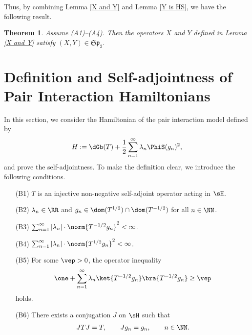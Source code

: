 \documentclass[12pt,draft]{article}
\theoremstyle{plain}
\newtheorem{thm}[theorem]{\bf Theorem}
\numberwithin{equation}{section}
\theoremstyle{remark}
\begin{document}
Thus, by combining Lemma \ref{X and Y} and Lemma \ref{Y is HS}, we have the following result.
\begin{thm}\label{SP2}
  Assume (A1)--(A4). Then the operators $X$ and $Y$ defined in Lemma \ref{X and Y} satisfy
$(X,Y)\in\mathfrak{Sp}_2$.
\end{thm}






\section{Definition and Self-adjointness of Pair Interaction Hamiltonians}\label{DefModel}
In this section, we consider the Hamiltonian of the pair interaction model defined by
\begin{align}
  H := \dGb(T) + \frac{1}{2} \sum_{n=1}^\infty \lambda_n \PhiS(g_n)^2, \label{hamil}
\end{align}
and prove the self-adjointness.
To make the definition clear, we introduce the following conditions.
\begin{enumerate}
\item[(B1)] $T$ is an injective non-negative self-adjoint operator acting in $\sH$.
\item[(B2)] $\lambda_n\in\RR$ and $g_n\in\dom(T^{1/2})\cap\dom(T^{-1/2})$ for all $n\in\NN$.
\item[(B3)] $\sum_{n=1}^\infty |\lambda_n| \cdot\norm{T^{-1/2}g_n}^2<\infty$.
\item[(B4)] $\sum_{n=1}^\infty |\lambda_n| \cdot\norm{T^{1/2}g_n}^2<\infty$.
\item[(B5)] For some $\vep>0$, the operator inequality
  \begin{equation}\label{B5}
    \one + \sum_{n=1}^\infty \lambda_n \ket{T^{-1/2}g_n} \bra{T^{-1/2}g_n} \geq \vep
  \end{equation}
holds.
\item[(B6)] There exists a conjugation $J$ on $\sH$ such that 
  \begin{align*}
    JTJ = T, \qquad Jg_n = g_n, \qquad n\in\NN.
  \end{align*}
\end{enumerate}
\end{document}
